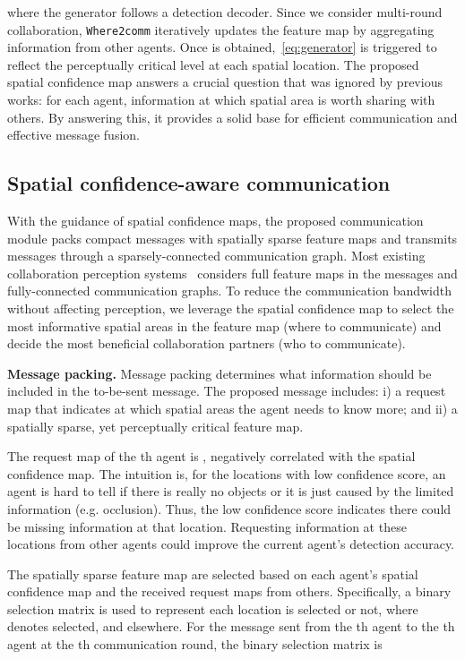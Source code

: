 \documentclass{article}
\begin{document}
where the generator  follows a detection decoder. Since we consider multi-round collaboration, \texttt{Where2comm} iteratively updates the feature map by aggregating information from other agents. Once  is obtained,~\eqref{eq:generator} is triggered to reflect the perceptually critical level at each spatial location. The proposed spatial confidence map answers a crucial question that was ignored by previous works: for each agent, information at which spatial area is worth sharing with others. By answering this, it provides a solid base for efficient communication and effective message fusion.

\vspace{-2mm}
\subsection{Spatial confidence-aware communication}
\label{sec:Comm}
\vspace{-2mm}
With the guidance of spatial confidence maps, the proposed communication module packs compact messages with spatially sparse feature maps and transmits messages through a sparsely-connected communication graph. Most existing collaboration perception systems~\cite{v2vnet,disconet,xu2022v2x} considers full feature maps in the messages and fully-connected communication graphs. To reduce the communication bandwidth without affecting perception, we leverage the spatial confidence map to select the most informative spatial areas in the feature map (where to communicate) and decide the most beneficial collaboration partners (who to communicate).

\textbf{Message packing.} Message packing determines what information should be included in the to-be-sent message. The proposed message includes: i) a request map that indicates at which spatial areas the agent needs to know more; and ii) a spatially sparse, yet perceptually critical feature map.

The request map of the th agent is , negatively correlated with the spatial confidence map. The intuition is, for the locations with low confidence score, an agent is hard to tell if there is really no objects or it is just caused by the limited information (e.g. occlusion). Thus, the low confidence score indicates there could be missing information at that location. Requesting information at these locations from other agents could improve the current agent's detection accuracy.

The spatially sparse feature map are selected based on each agent's spatial confidence map and the received request maps from others. Specifically, a binary selection matrix is used to represent each location is selected or not, where  denotes selected, and  elsewhere. For the message sent from the th agent to the th agent at the th communication round, the binary selection matrix is
\end{document}
